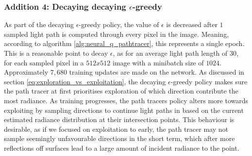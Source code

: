 \documentclass[../dissertation.tex]{subfiles}
\begin{document}
\subsubsection*{Addition 4: Decaying decaying $\epsilon$-greedy}
As part of the decaying $\epsilon$-greedy policy, the value of $\epsilon$ is decreased after $1$ sampled light path is computed through every pixel in the image. Meaning, according to algorithm \ref{alg:neural_q_pathtracer}, this represents a single epoch. This is a reasonable point to decay $\epsilon$, as for an average light path length of $30$, for each sampled pixel in a $512x512$ image with a minibatch size of $1024$. Approximately $7,680$ training updates are made on the network. As discussed in section \ref{eq:exploration_vs_exploitation}, the decaying $\epsilon$-greedy policy makes sure the path tracer at first prioritises exploration of which direction contribute the most radiance. As training progresses, the path tracers policy alters more towards exploiting by sampling directions to continue light paths in based on the current estimated radiance distribution at their intersection points. This behaviour is desirable, as if we focused on exploitation to early, the path tracer may not sample seemingly unfavourable directions in the short term, which after more reflections off surfaces lead to a large amount of incident radiance to the point.
\end{document}
